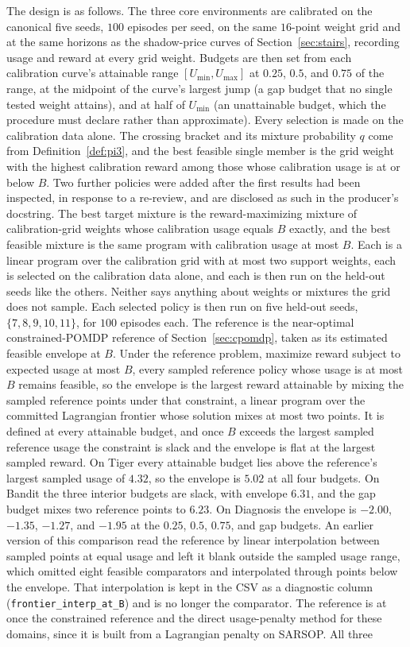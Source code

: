 The design is as follows. The three core environments are calibrated on the canonical five seeds, $100$ episodes per seed, on the same $16$-point weight grid and at the same horizons as the shadow-price curves of Section~\ref{sec:stairs}, recording usage and reward at every grid weight. Budgets are then set from each calibration curve's attainable range $[U_{\min}, U_{\max}]$ at $0.25$, $0.5$, and $0.75$ of the range, at the midpoint of the curve's largest jump (a gap budget that no single tested weight attains), and at half of $U_{\min}$ (an unattainable budget, which the procedure must declare rather than approximate). Every selection is made on the calibration data alone. The crossing bracket and its mixture probability $q$ come from Definition~\ref{def:pi3}, and the best feasible single member is the grid weight with the highest calibration reward among those whose calibration usage is at or below $B$. Two further policies were added after the first results had been inspected, in response to a re-review, and are disclosed as such in the producer's docstring. The best target mixture is the reward-maximizing mixture of calibration-grid weights whose calibration usage equals $B$ exactly, and the best feasible mixture is the same program with calibration usage at most $B$. Each is a linear program over the calibration grid with at most two support weights, each is selected on the calibration data alone, and each is then run on the held-out seeds like the others. Neither says anything about weights or mixtures the grid does not sample. Each selected policy is then run on five held-out seeds, $\{7, 8, 9, 10, 11\}$, for $100$ episodes each. The reference is the near-optimal constrained-POMDP reference of Section~\ref{sec:cpomdp}, taken as its estimated feasible envelope at $B$. Under the reference problem, maximize reward subject to expected usage at most $B$, every sampled reference policy whose usage is at most $B$ remains feasible, so the envelope is the largest reward attainable by mixing the sampled reference points under that constraint, a linear program over the committed Lagrangian frontier whose solution mixes at most two points. It is defined at every attainable budget, and once $B$ exceeds the largest sampled reference usage the constraint is slack and the envelope is flat at the largest sampled reward. On Tiger every attainable budget lies above the reference's largest sampled usage of $4.32$, so the envelope is $5.02$ at all four budgets. On Bandit the three interior budgets are slack, with envelope $6.31$, and the gap budget mixes two reference points to $6.23$. On Diagnosis the envelope is $-2.00$, $-1.35$, $-1.27$, and $-1.95$ at the $0.25$, $0.5$, $0.75$, and gap budgets. An earlier version of this comparison read the reference by linear interpolation between sampled points at equal usage and left it blank outside the sampled usage range, which omitted eight feasible comparators and interpolated through points below the envelope. That interpolation is kept in the CSV as a diagnostic column (\texttt{frontier\_\allowbreak interp\_\allowbreak at\_\allowbreak B}) and is no longer the comparator. The reference is at once the constrained reference and the direct usage-penalty method for these domains, since it is built from a Lagrangian penalty on SARSOP. All three 